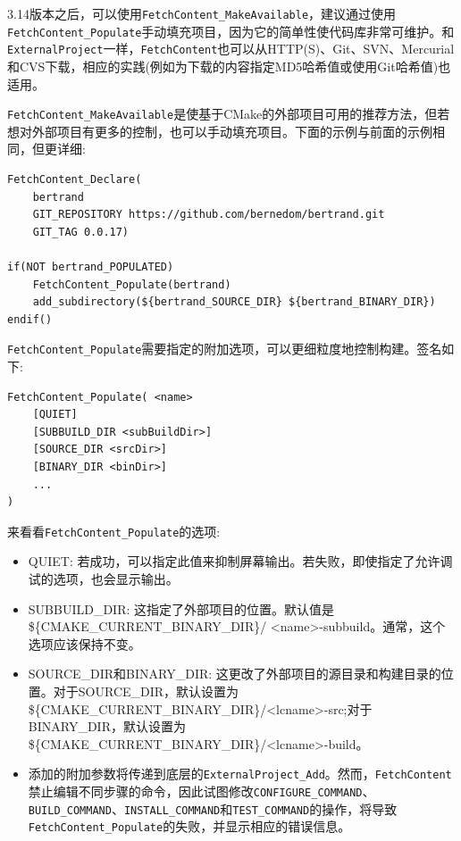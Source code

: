 3.14版本之后，可以使用\texttt{FetchContent\_MakeAvailable}，建议通过使用\texttt{FetchContent\_Populate}手动填充项目，因为它的简单性使代码库非常可维护。和\texttt{ExternalProject}一样，\texttt{FetchContent}也可以从HTTP(S)、Git、SVN、Mercurial和CVS下载，相应的实践(例如为下载的内容指定MD5哈希值或使用Git哈希值)也适用。

\texttt{FetchContent\_MakeAvailable}是使基于CMake的外部项目可用的推荐方法，但若想对外部项目有更多的控制，也可以手动填充项目。下面的示例与前面的示例相同，但更详细:

\begin{lstlisting}[style=styleCMake]
FetchContent_Declare(
	bertrand
	GIT_REPOSITORY https://github.com/bernedom/bertrand.git
	GIT_TAG 0.0.17)
	
if(NOT bertrand_POPULATED)
	FetchContent_Populate(bertrand)
	add_subdirectory(${bertrand_SOURCE_DIR} ${bertrand_BINARY_DIR})
endif()
\end{lstlisting}

\texttt{FetchContent\_Populate}需要指定的附加选项，可以更细粒度地控制构建。签名如下:

\begin{lstlisting}[style=styleCMake]
FetchContent_Populate( <name>
	[QUIET]
	[SUBBUILD_DIR <subBuildDir>]
	[SOURCE_DIR <srcDir>]
	[BINARY_DIR <binDir>]
	...
)
\end{lstlisting}

来看看\texttt{FetchContent\_Populate}的选项:

\begin{itemize}
\item 
QUIET: 若成功，可以指定此值来抑制屏幕输出。若失败，即使指定了允许调试的选项，也会显示输出。

\item
SUBBUILD\_DIR: 这指定了外部项目的位置。默认值是\$\{CMAKE\_CURRENT\_BINARY\_DIR\}/ <name>-subbuild。通常，这个选项应该保持不变。

\item
SOURCE\_DIR和BINARY\_DIR: 这更改了外部项目的源目录和构建目录的位置。对于SOURCE\_DIR，默认设置为\$\{CMAKE\_CURRENT\_BINARY\_DIR\}/<lcname>-src;对于BINARY\_DIR，默认设置为\$\{CMAKE\_CURRENT\_BINARY\_DIR\}/<lcname>-build。

\item
添加的附加参数将传递到底层的\texttt{ExternalProject\_Add}。然而，\texttt{FetchContent}禁止编辑不同步骤的命令，因此试图修改\texttt{CONFIGURE\_COMMAND}、\texttt{BUILD\_COMMAND}、\texttt{INSTALL\_COMMAND}和\texttt{TEST\_COMMAND}的操作，将导致\texttt{FetchContent\_Populate}的失败，并显示相应的错误信息。
\end{itemize}

